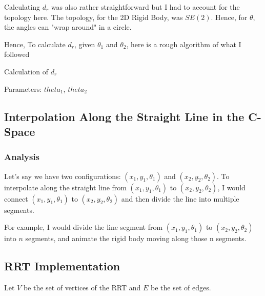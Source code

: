 \documentclass{article}
\begin{document}
Calculating $d_r$ was also rather straightforward but I had to account for the topology here. The topology, for the 2D Rigid Body, was $SE(2)$. Hence, for $\theta$, the angles can "wrap around" in a circle. 

Hence, To calculate $d_r$, given $\theta_1$ and $\theta_2$, here is a rough algorithm of what I followed


\begin{algorithm}
\caption{Calculation of $d_r$}
\begin{algorithmic}
\STATE Parameters: $theta_1$, $theta_2$


\end{algorithmic}
\end{algorithm}


\subsection{Interpolation Along the Straight Line in the C-Space}
\subsubsection{Analysis}
Let's say we have two configurations: $(x_1, y_1, \theta_1)$ and $(x_2, y_2, \theta_2)$. To interpolate along the straight line from $(x_1, y_1, \theta_1)$ to  $(x_2, y_2, \theta_2)$, I would connect $(x_1, y_1, \theta_1)$ to  $(x_2, y_2, \theta_2)$ and then divide the line into multiple segments. \newline 

For example, I would divide the line segment from $(x_1, y_1, \theta_1)$ to  $(x_2, y_2, \theta_2)$ into $n$ segments, and animate the rigid body moving along those n segments. 

\subsection{RRT Implementation}

Let $V$ be the set of vertices of the RRT and $E$ be the set of edges. 
\end{document}

